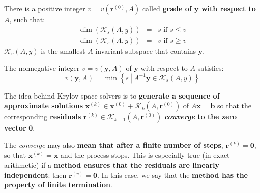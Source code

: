 \begin{lemma}
    There is a positive integer $v = v\left(\mathbf{r}^{\left(0\right)}, A\right)$ called \textbf{grade of $\mathbf{y}$ with respect to $A$}, such that:
    \begin{equation*}
        \begin{array}{rcl}
            \dim\left(\mathcal{K}_{s}\left(A, y\right)\right) &=& s \text{ if } s \le v\\ [.5em]
            \dim\left(\mathcal{K}_{s}\left(A, y\right)\right) &=& v \text{ if } s \ge v
        \end{array}
    \end{equation*}
    $\mathcal{K}_{v}\left(A, y\right)$ is the smallest $A$-invariant subspace that contains $\mathbf{y}$.
\end{lemma}

\begin{lemma}
    The nonnegative integer $v = v\left(\mathbf{y}, A\right)$ of $\mathbf{y}$ with respect to $A$ satisfies:
    \begin{equation*}
        v\left(\mathbf{y}, A\right) = \min\left\{
            s \: \left| \: A^{-1}\mathbf{y} \in \mathcal{K}_{s}\left(A, y\right) \right.
        \right\}
    \end{equation*}
\end{lemma}

\noindent
The idea behind Krylov space solvers is to \textbf{generate a sequence of approximate solutions} $\mathbf{x}^{\left(k\right)} \in \mathbf{x}^{\left(0\right)} + \mathcal{K}_{k}\left(A, \mathbf{r}^{\left(0\right)}\right)$ of $A\mathbf{x} = \mathbf{b}$ so that the corresponding \textbf{residuals} $\mathbf{r}^{\left(k\right)} \in \mathcal{K}_{k+1}\left(A, \mathbf{r}^{\left(0\right)}\right)$ \textbf{\emph{converge} to the zero vector} $\mathbf{0}$.

\highspace
The \emph{converge} may also \textbf{mean that after a finite number of steps}, $\mathbf{r}^{\left(k\right)} = \mathbf{0}$, so that $\mathbf{x}^{\left(k\right)} = \mathbf{x}$ and the process stops. This is especially true (in exact arithmetic) if a \textbf{method ensures that the residuals are linearly independent}: then $\mathbf{r}^{\left(v\right)} = \mathbf{0}$. In this case, we say that the \textbf{method has the property of finite termination}.

